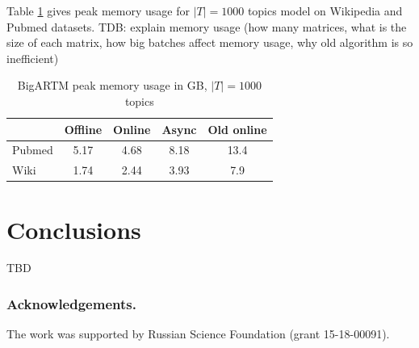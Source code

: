 \documentclass[russian,english]{llncs}
\begin{document}
Table \ref{tab:memory} gives peak memory usage for $|T| = 1000$ topics model on Wikipedia and Pubmed datasets.
TDB: explain memory usage (how many matrices, what is the size of each matrix, how big batches affect memory usage, why old algorithm is so inefficient)

\begin{table}[h]
	\caption{
		BigARTM peak memory usage in GB, $|T| = 1000$ topics
	}
	\label{tab:memory}
	\centering\tabcolsep=4.3pt
	\begin{tabular}[t]{|l|cccc|}
		\hline
		& Offline   & Online    & Async     & Old online  \\
		\hline
		Pubmed	& {5.17}   	& {4.68}   	& {8.18}   	& {13.4}      \\
		Wiki	& {1.74}   	& {2.44}   	& {3.93}   	& {7.9}       \\ 
		\hline
	\end{tabular}
\end{table}



\section{Conclusions}
\label{sec:Conclusions}


TBD

\bigskip
\subsubsection*{Acknowledgements.}
\nopagebreak
The work was supported by Russian Science Foundation (grant 15-18-00091).

%
%
\end{document}
